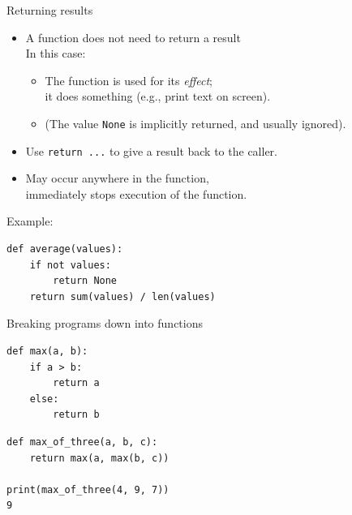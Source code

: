 \documentclass[aspectratio=169,usenames,dvipsnames]{beamer}
\begin{document}
\begin{frame}[fragile]{Returning results}
    \begin{itemize}
        \item A function does not need to return a result \\
            In this case:
            \begin{itemize}
                \item The function is used for its \emph{effect};\\
                    it does something (e.g., print text on screen).
                \item (The value \lstinline{None} is implicitly returned,
                        and usually ignored).
            \end{itemize}
        \item Use \lstinline{return ...}
            to give a result back to the caller.
        \item May occur anywhere in the function,\\
                immediately stops execution of the function.
    \end{itemize}

Example:
\begin{lstlisting}
def average(values):
    if not values:
        return None
    return sum(values) / len(values)
\end{lstlisting}
\end{frame}

\begin{frame}[fragile]{Breaking programs down into functions}
\begin{lstlisting}
def max(a, b):
    if a > b:
        return a
    else:
        return b
\end{lstlisting}

\pause\vspace{1em}
\begin{lstlisting}
def max_of_three(a, b, c):
    return max(a, max(b, c))

print(max_of_three(4, 9, 7))
9
\end{lstlisting}
\end{frame}

% 
% 
% 
% 
\end{document}
